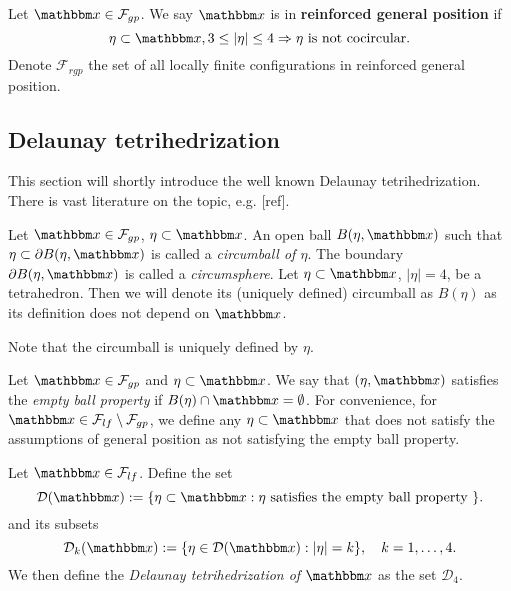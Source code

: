 \begin{definition}
Let $\x \in \mathcal F_{gp}$. We say $\x$ is in \textbf{reinforced general position} if 
$$ \eta \subset \x, 3 \leq |\eta| \leq 4 \Rightarrow \eta \text{ is not cocircular.} $$   
Denote $\mathcal F_{rgp}$ the set of all locally finite configurations in reinforced general position.
\end{definition}


\subsection{Delaunay tetrihedrization}
This section will shortly introduce the well known Delaunay tetrihedrization. There is vast literature on the topic, e.g. [ref]. 


\begin{definition}
	Let $\x \in \mathcal F_{gp}$, $\eta \subset \x$. An open ball $B(\eta,\x)$ such that $\eta \subset \partial B(\eta,\x)$ is called a \textit{circumball of $\eta$}. The boundary $\partial B(\eta,\x)$ is called a \textit{circumsphere}.
	Let $\eta\subset\x$, $|\eta|=4$, be a tetrahedron. Then we will denote its (uniquely defined) circumball as $B(\eta)$ as its definition does not depend on $\x$. 
\end{definition}	

Note that the circumball is uniquely defined by $\eta$. 

\begin{definition}
	Let $\x \in \mathcal F_{gp}$ and $\eta \subset \x$. We say that $(\eta,\x)$ satisfies the \textit{empty ball property} if $B(\eta) \cap \x = \emptyset$. 
	For convenience, for $\x \in \mathcal F_{lf}\setminus \mathcal F_{gp}$, we define any $\eta\subset \x$ that does not satisfy the assumptions of general position as not satisfying the empty ball property.
\end{definition}

\begin{definition}
	Let $\x \in \mathcal F_{lf}$. Define the set 
	$$\mathcal {D}(\x) := \{\eta\subset \x: \eta \text{ satisfies the empty ball property }\}.$$
	and its subsets
	$$\mathcal {D}_k(\x) := \{\eta \in \mathcal {D}(\x): |\eta|=k \},\quad k = 1,\dots,4.$$
	We then define the \textit{Delaunay tetrihedrization of $\x$} as the set $\mathcal D_4$. 
\end{definition}

